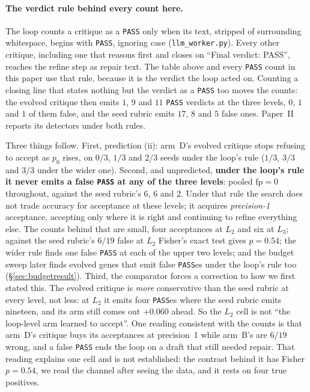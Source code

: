\documentclass[11pt]{article}
\begin{document}
\paragraph{The verdict rule behind every count here.} The loop counts a critique as a
\texttt{PASS} only when its text, stripped of surrounding whitespace, begins with \texttt{PASS},
ignoring case (\texttt{llm\_worker.py}). Every other critique, including one that reasons first
and closes on ``Final verdict: PASS'', reaches the refine step as repair text. The table above and
every \texttt{PASS} count in this paper use that rule, because it is the verdict the loop acted
on. Counting a closing line that states nothing but the verdict as a \texttt{PASS} too moves the
counts: the evolved critique then emits $1$, $9$ and $11$ \texttt{PASS} verdicts at the three
levels, $0$, $1$ and $1$ of them false, and the seed rubric emits $17$, $8$ and $5$ false ones.
Paper~II reports its detectors under both rules.

Three things follow. First, prediction (ii): arm~D's evolved critique stops refusing to accept
as $p_0$ rises, on $0/3$, $1/3$ and $2/3$ seeds under the loop's rule ($1/3$, $3/3$ and $3/3$
under the wider one). Second, and unpredicted, \textbf{under the loop's rule it never emits a
false \texttt{PASS} at any of the three levels}: pooled $\mathrm{fp} = 0$ throughout, against the
seed rubric's $6$, $6$ and $2$. Under that rule the search does not trade accuracy for acceptance
at these levels; it acquires \emph{precision-1} acceptance, accepting only where it is right and
continuing to refine everything else. The counts behind that are small, four acceptances at $L_2$
and six at $L_3$; against the seed rubric's $6/19$ false at $L_2$ Fisher's exact test gives
$p = 0.54$; the wider rule finds one false \texttt{PASS} at each of the upper two levels; and the
budget sweep later finds evolved genes that emit false \texttt{PASS}es under the loop's rule too
(\S\ref{sec:budgetresult}). Third, the comparator forces a correction to how we first stated
this. The evolved critique is \emph{more} conservative than the seed rubric at every level, not
less: at $L_2$ it emits four \texttt{PASS}es where the seed rubric emits nineteen, and its arm
still comes out $+0.060$ ahead. So the $L_2$ cell is not ``the loop-level arm learned to accept''.
One reading consistent with the counts is that arm~D's critique buys its acceptances at
precision~1 while arm~B's are $6/19$ wrong, and a false \texttt{PASS} ends the loop on a draft
that still needed repair. That reading explains one cell and is not established: the contrast
behind it has Fisher $p = 0.54$, we read the channel after seeing the data, and it rests on four
true positives.
\end{document}
